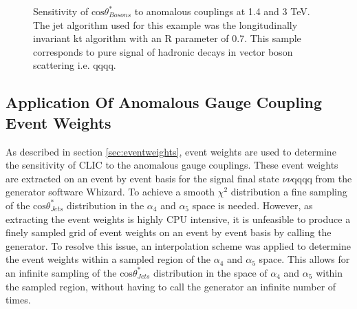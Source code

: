 \begin{figure}
\caption[Sensitivity of $\text{cos}\theta^{8}_{Bosons}$ to the anomalous gauge couplings $\alpha_{4}$ and $\alpha_{5}$ at 1.4 and 3 TeV.]{Sensitivity of $\text{cos}\theta^{*}_{Bosons}$ to anomalous couplings at 1.4 and 3 TeV. The jet algorithm used for this example was the longitudinally invariant kt algorithm with an R parameter of 0.7. This sample corresponds to pure signal of hadronic decays in vector boson scattering i.e. \nu{\nu}qqqq.}
\label{fig:costhetastarbosons}
\end{figure}




\subsection{Application Of Anomalous Gauge Coupling Event Weights}
\label{sec:eventweightsinterpolation}
As described in section \ref{sec:eventweights}, event weights are used to determine the sensitivity of CLIC to the anomalous gauge couplings.  These event weights are extracted on an event by event basis for the signal final state $\nu\nu\text{qqqq}$ from the generator software Whizard.  To achieve a smooth $\chi^{2}$ distribution a fine sampling of the $\text{cos}\theta^{*}_{Jets}$ distribution in the $\alpha_{4}$ and $\alpha_{5}$ space is needed.  However, as extracting the event weights is highly CPU intensive, it is unfeasible to produce a finely sampled grid of event weights on an event by event basis by calling the generator.  To resolve this issue, an interpolation scheme was applied to determine the event weights within a sampled region of the $\alpha_{4}$ and $\alpha_{5}$ space.  This allows for an infinite sampling of the $\text{cos}\theta^{*}_{Jets}$ distribution in the space of $\alpha_{4}$ and $\alpha_{5}$ within the sampled region, without having to call the generator an infinite number of times.

